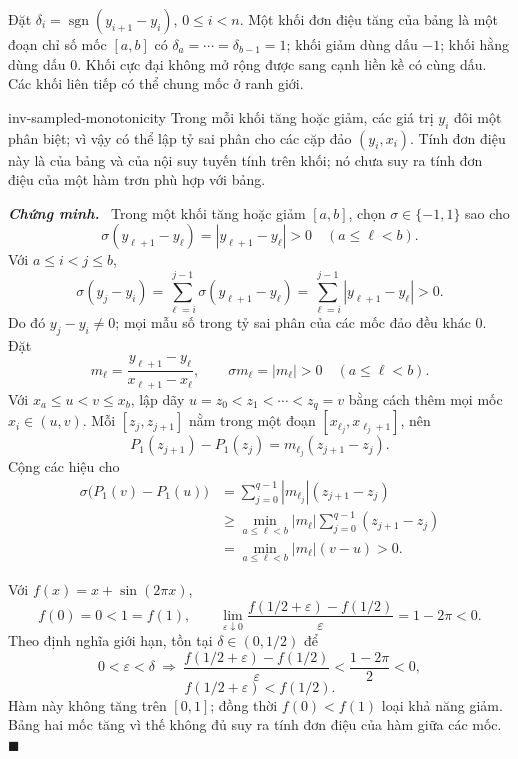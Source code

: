 \documentclass[12pt,a4paper,oneside]{book}
\numberwithin{algorithm}{chapter}
\theoremstyle{definition}
\newenvironment{chungminh}{\par\medskip\noindent\textbf{\textit{\color{mainblue}Chứng minh.}}\ }{\hfill$\blacksquare$\par\medskip}
\begin{document}
Đặt $\delta_i=\operatorname{sgn}(y_{i+1}-y_i)$, $0\leq i<n$. Một khối đơn điệu tăng của bảng là một đoạn chỉ số mốc $[a,b]$ có $\delta_a=\cdots=\delta_{b-1}=1$; khối giảm dùng dấu $-1$; khối hằng dùng dấu $0$. Khối cực đại không mở rộng được sang cạnh liền kề có cùng dấu. Các khối liên tiếp có thể chung mốc ở ranh giới.
\begin{menhde}{}{inv-sampled-monotonicity}
Trong mỗi khối tăng hoặc giảm, các giá trị $y_i$ đôi một phân biệt; vì vậy có thể lập tỷ sai phân cho các cặp đảo $(y_i,x_i)$. Tính đơn điệu này là của bảng và của nội suy tuyến tính trên khối; nó chưa suy ra tính đơn điệu của một hàm trơn phù hợp với bảng.
\end{menhde}
\begin{chungminh}
Trong một khối tăng hoặc giảm $[a,b]$, chọn
$\sigma\in\{-1,1\}$ sao cho
\[
 \sigma(y_{\ell+1}-y_\ell)=|y_{\ell+1}-y_\ell|>0
 \quad(a\leq\ell<b).
\]
Với $a\leq i<j\leq b$,
\[
 \sigma(y_j-y_i)
 =\sum_{\ell=i}^{j-1}\sigma(y_{\ell+1}-y_\ell)
 =\sum_{\ell=i}^{j-1}|y_{\ell+1}-y_\ell|>0.
\]
Do đó $y_j-y_i\ne0$; mọi mẫu số trong tỷ sai phân của các mốc đảo đều khác $0$.
Đặt
\[
 m_\ell=\frac{y_{\ell+1}-y_\ell}{x_{\ell+1}-x_\ell},
 \qquad\sigma m_\ell=|m_\ell|>0\quad(a\leq\ell<b).
\]
Với $x_a\leq u<v\leq x_b$, lập dãy
$u=z_0<z_1<\cdots<z_q=v$ bằng cách thêm mọi mốc $x_i\in(u,v)$.
Mỗi $[z_j,z_{j+1}]$ nằm trong một đoạn $[x_{\ell_j},x_{\ell_j+1}]$, nên
\[
 P_1(z_{j+1})-P_1(z_j)=m_{\ell_j}(z_{j+1}-z_j).
\]
Cộng các hiệu cho
\begin{align*}
 \sigma\bigl(P_1(v)-P_1(u)\bigr)
 &=\sum_{j=0}^{q-1}|m_{\ell_j}|(z_{j+1}-z_j)\\
 &\geq\min_{a\leq\ell<b}|m_\ell|\sum_{j=0}^{q-1}(z_{j+1}-z_j)\\
 &=\min_{a\leq\ell<b}|m_\ell|(v-u)>0.
\end{align*}

Với $f(x)=x+\sin(2\pi x)$,
\[
 f(0)=0<1=f(1),\qquad
 \lim_{\varepsilon\downarrow0}
 \frac{f(1/2+\varepsilon)-f(1/2)}{\varepsilon}
 =1-2\pi<0.
\]
Theo định nghĩa giới hạn, tồn tại $\delta\in(0,1/2)$ để
\[
 0<\varepsilon<\delta\ \Longrightarrow\
 \frac{f(1/2+\varepsilon)-f(1/2)}{\varepsilon}
 <\frac{1-2\pi}{2}<0,
\]
\[
 f(1/2+\varepsilon)<f(1/2).
\]
Hàm này không tăng trên $[0,1]$; đồng thời $f(0)<f(1)$ loại khả năng giảm. Bảng hai mốc tăng vì thế không đủ suy ra tính đơn điệu của hàm giữa các mốc.
\end{chungminh}
\end{document}
